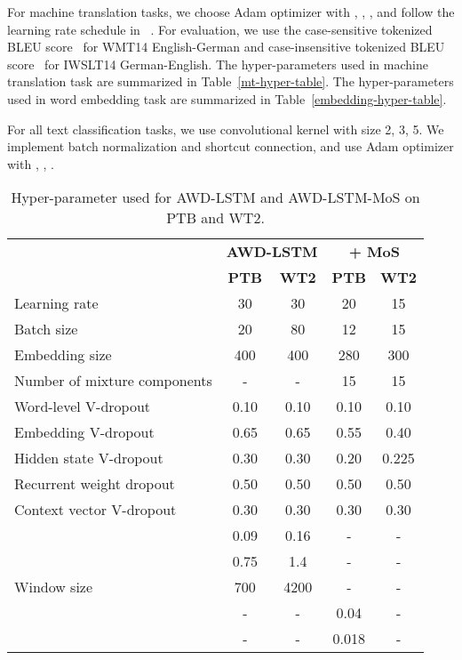 \documentclass{article}
\begin{document}
For machine translation tasks, we choose Adam optimizer with , , , and follow the learning rate schedule in ~\cite{vaswani2017attention}. For evaluation, we use the case-sensitive tokenized BLEU score~\cite{papineni2002bleu} for WMT14 English-German and  case-insensitive tokenized BLEU score~\cite{papineni2002bleu} for IWSLT14 German-English. The hyper-parameters used in machine translation task are summarized in Table~\ref{mt-hyper-table}. The hyper-parameters used in word embedding task are summarized in Table~\ref{embedding-hyper-table}.

For all text classification tasks, we use convolutional kernel with size 2, 3, 5. We implement batch normalization and shortcut connection, and use Adam optimizer with , , .

\begin{table}[!htbp]
\begin{center}
		\begin{tabular}{l|cc||cc}
			\toprule
             & \multicolumn{2}{c||}{\bf AWD-LSTM} & \multicolumn{2}{c}{\bf + MoS} \\
			 &\bf PTB &\bf WT2&\bf PTB &\bf WT2 \\
            \hline
            Learning rate &30&30&20&15 \\
            Batch size  &20&80&12&15 \\
            Embedding size  &400&400&280&300 \\
Number of mixture components  &-&-&15&15 \\
            \hline
            Word-level V-dropout  &0.10&0.10&0.10&0.10 \\
            Embedding V-dropout  &0.65&0.65&0.55&0.40 \\
            Hidden state V-dropout  &0.30&0.30&0.20&0.225 \\
            Recurrent weight dropout  &0.50&0.50&0.50&0.50 \\
            Context vector V-dropout  &0.30&0.30&0.30&0.30 \\
            \hline
             & 0.09 & 0.16 & - & -\\
             & 0.75 & 1.4 & - & - \\
            Window size & 700 & 4200 & - & - \\
            \hline
             & - & - & 0.04 & - \\
             & - & - & 0.018 & - \\
            \bottomrule
		\end{tabular}
	\end{center}
	\caption{\label{lm-hyper-table} Hyper-parameter used for AWD-LSTM and AWD-LSTM-MoS on PTB and WT2. }
\end{table}
\end{document}
